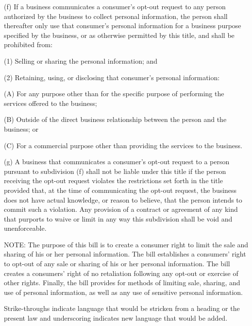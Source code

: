 (f) If a business communicates a consumer’s opt-out request to any person authorized by the business to collect personal information, the person shall thereafter only use that consumer’s personal information for a business purpose specified by the business, or as otherwise permitted by this title, and shall be prohibited from:

(1) Selling or sharing the personal information; and

(2) Retaining, using, or disclosing that consumer’s personal information:

(A) For any purpose other than for the specific purpose of performing the services offered to the business;

(B) Outside of the direct business relationship between the person and the business; or

(C) For a commercial purpose other than providing the services to the business.

(g) A business that communicates a consumer’s opt-out request to a person pursuant to subdivision (f) shall not be liable under this title if the person receiving the opt-out request violates the restrictions set forth in the title provided that, at the time of communicating the opt-out request, the business does not have actual knowledge, or reason to believe, that the person intends to commit such a violation. Any provision of a contract or agreement of any kind that purports to waive or limit in any way this subdivision shall be void and unenforceable.

 

NOTE: The purpose of this bill is to create a consumer right to limit the sale and sharing of his or her personal information. The bill establishes a consumers’ right to opt-out of any sale or sharing of his or her personal information. The bill creates a consumers’ right of no retaliation following any opt-out or exercise of other rights. Finally, the bill provides for methods of limiting sale, sharing, and use of personal information, as well as any use of sensitive personal information.

Strike-throughs indicate language that would be stricken from a heading or the present law and underscoring indicates new language that would be added.